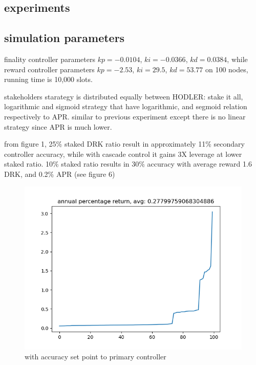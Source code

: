 \documentclass{article}
\begin{document}
\subsection {experiments}
\begin{description}
\subsection {simulation parameters}
\item finality controller parameters  $kp=-0.0104$, $ki=-0.0366$, $kd=0.0384$, while reward controller parameters  $kp=-2.53$, $ki=29.5$, $kd=53.77$ on 100 nodes, running time is 10,000 slots.
  \item stakeholders starategy is distributed equally between HODLER: stake it all,  logarithmic and sigmoid strategy that have logarithmic, and segmoid relation respectively to APR. similar to previous experiment except there is no linear strategy since APR is much lower.


\item from figure 1, 25\% staked DRK ratio result in approximately 11\% secondary controller accuracy, while with cascade control it gains 3X leverage at lower staked ratio. 10\% staked ratio results in 30\% accuracy with average reward 1.6 DRK, and 0.2\% APR (see figure 6)
\end{description}
\begin{figure}
    \includegraphics{acc_setpoint_quarterstake.png}
    \caption{with accuracy set point to primary controller}
\end{figure}
\end{document}
